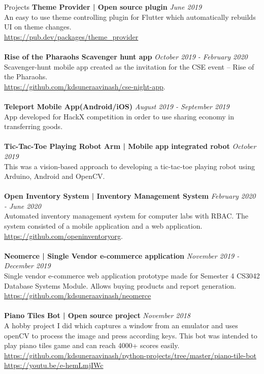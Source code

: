 \documentclass{cv}
\begin{document}
\begin{rSection}{Projects}
{\bf Theme Provider | Open source plugin}                        \hfill {\em June 2019} 
\\An easy to use theme controlling plugin for Flutter which automatically rebuilds UI on theme changes.\\
\url{https://pub.dev/packages/theme\_provider} \\
\\{\bf Rise of the Pharaohs Scavenger hunt app}                 \hfill {\em October 2019 - February 2020} 
\\Scavenger-hunt mobile app created as the invitation for the CSE event – Rise of the Pharaohs.\\
\url{https://github.com/kdsuneraavinash/cse-night-app}. \\
\\{\bf Teleport Mobile App(Android/iOS)}                        \hfill {\em August 2019 - September 2019} 
\\App developed for HackX competition in order to use sharing economy in transferring goods. \\
\\{\bf Tic-Tac-Toe Playing Robot Arm | Mobile app integrated robot}     \hfill {\em October 2019}
\\This was a vision-based approach to developing a tic-tac-toe playing robot using Arduino, Android and OpenCV.\\
\\{\bf Open Inventory System | Inventory Management System}     \hfill {\em February 2020 - June 2020} 
\\Automated inventory management system for computer labs with RBAC. The system consisted of a mobile application and a web application.\\
\url{https://github.com/openinventoryorg}.\\
\\{\bf Neomerce | Single Vendor e-commerce application}         \hfill {\em November 2019 - December 2019}
\\Single vendor e-commerce web application prototype made for Semester 4 CS3042 Database Systems Module.
Allows buying products and report generation.\\
\url{https://github.com/kdsuneraavinash/neomerce}\\
\\{\bf Piano Tiles Bot | Open source project}                   \hfill {\em November 2018}
\\A hobby project I did which captures a window from an emulator and uses openCV to process the image and press according keys. This bot was intended to play piano tiles game and can reach 4000+ scores easily.\\
\url{https://github.com/kdsuneraavinash/python-projects/tree/master/piano-tile-bot}\\
\url{https://youtu.be/e-hemLmjIWc}\\
\end{rSection}


\end{document}
